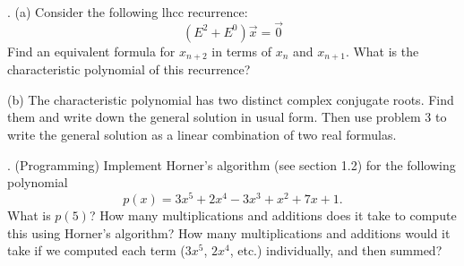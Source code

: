 \documentclass[12 pt]{article}
\begin{document}
\medskip

.
(a) Consider the following lhcc recurrence:
$$
(E^2 + E^0)\vec{x} = \vec{0}
$$
Find an equivalent formula for $x_{n+2}$ in terms of $x_n$ and $x_{n+1}$. What is the characteristic polynomial of this recurrence?

\noindent
(b) The characteristic polynomial has two distinct complex conjugate roots. Find them and write down the general solution in usual form. 
Then use problem 3 to write the general solution as a linear combination of two real formulas.

. (Programming)
Implement Horner's algorithm (see section 1.2) for the following polynomial 
$$
p(x) = 3x^5 + 2x^4 - 3x^3 + x^2 + 7x + 1.
$$
What is $p(5)$? How many multiplications and additions does it take to compute this using Horner's algorithm? How many multiplications and additions would it take if we computed each term ($3x^5$, $2x^4$, etc.) individually, and then summed? 
\end{document}
